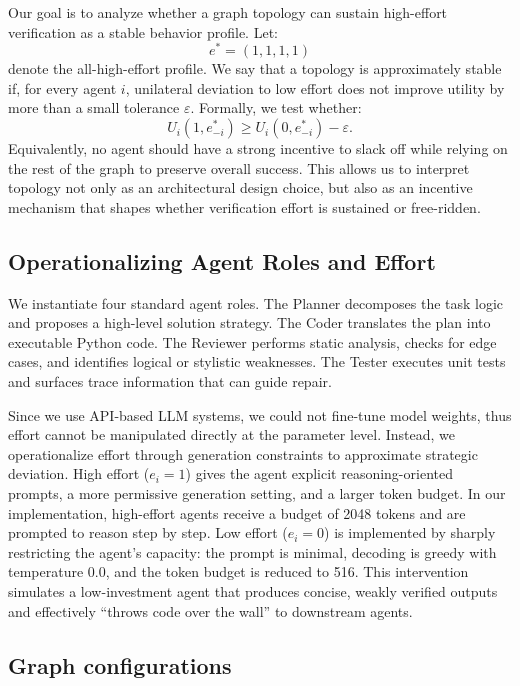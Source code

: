 \documentclass[manuscript,screen,review]{acmart}
\begin{document}
Our goal is to analyze whether a graph topology can sustain high-effort verification as a stable behavior profile. Let:
\begin{equation}
e^* = (1, 1, 1, 1)
\end{equation}
denote the all-high-effort profile. We say that a topology is approximately stable if, for every agent $i$, unilateral deviation to low effort does not improve utility by more than a small tolerance $\varepsilon$. Formally, we test whether:
\begin{equation}
U_i(1, e_{-i}^*) \geq U_i(0, e_{-i}^*) - \varepsilon.
\end{equation}
Equivalently, no agent should have a strong incentive to slack off while relying on the rest of the graph to preserve overall success. This allows us to interpret topology not only as an architectural design choice, but also as an incentive mechanism that shapes whether verification effort is sustained or free-ridden.

\subsection{Operationalizing Agent Roles and Effort}

We instantiate four standard agent roles. The Planner decomposes the task logic and proposes a high-level solution strategy. The Coder translates the plan into executable Python code. The Reviewer performs static analysis, checks for edge cases, and identifies logical or stylistic weaknesses. The Tester executes unit tests and surfaces trace information that can guide repair.

Since we use API-based LLM systems, we could not fine-tune model weights, thus effort cannot be manipulated directly at the parameter level. Instead, we operationalize effort through generation constraints to approximate strategic deviation. High effort ($e_i = 1$) gives the agent explicit reasoning-oriented prompts, a more permissive generation setting, and a larger token budget. In our implementation, high-effort agents receive a budget of 2048 tokens and are prompted to reason step by step. Low effort ($e_i = 0$) is implemented by sharply restricting the agent’s capacity: the prompt is minimal, decoding is greedy with temperature 0.0, and the token budget is reduced to 516. This intervention simulates a low-investment agent that produces concise, weakly verified outputs and effectively “throws code over the wall” to downstream agents.

\subsection{Graph configurations}
\end{document}
